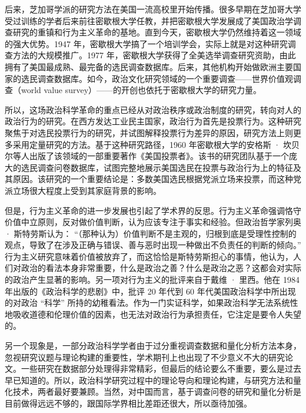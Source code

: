 后来，芝加哥学派的研究方法在美国一流高校里开始传播。很多早期在芝加哥大学受过训练的学者后来前往密歇根大学任教，并把密歇根大学发展成了美国政治学调查研究的重镇和行为主义革命的基地。直到今天，密歇根大学仍然维持着这一领域的强大优势。1947 年，密歇根大学搞了一个培训学会，实际上就是对这种研究调查方法的大规模推广。1977 年，密歇根大学获得了全美选举调查研究资助，由此拥有了美国最成熟、最完备的选民调查数据库。后来，其他机构开始做欧洲主要国家的选民调查数据库。如今，政治文化研究领域的一个重要调查——世界价值观调查（world value survey）——的开创也依托于密歇根大学的研究力量。

所以，这场政治科学革命的重点已经从对政治秩序或政治制度的研究，转向对人的政治行为的研究。在西方发达工业民主国家，政治行为首先是投票行为。这种研究聚焦于对选民投票行为的研究，并试图解释投票行为差异的原因，研究方法上则更多采用定量研究的方法。基于这种研究路径，1960 年密歇根大学的安格斯 · 坎贝尔等人出版了该领域的一部重要著作《美国投票者》。该书的研究团队基于一个庞大的选民调查问卷数据库，试图完整地展示美国选民在投票与政治行为上的特征及其原因。该研究的一个重要结论是：多数美国选民根据党派立场来投票，而这种党派立场很大程度上受到其家庭背景的影响。

但是，行为主义革命的进一步发展也引起了学术界的反思。行为主义革命强调恪守价值中立原则，反对做价值判断，认为应该专注于事实和经验。但政治哲学家列奥 · 斯特劳斯认为： “（那种认为）价值判断不是主观的，归根到底是受理性控制的观点，导致了在涉及正确与错误、善与恶时出现一种做出不负责任的判断的倾向。” 行为主义研究意味着价值被放弃了，而这恰恰是斯特劳斯担心的事情，他认为，人们对政治的看法本身非常重要，什么是政治之善？什么是政治之恶？这都会对实际的政治产生显著的影响。另一项对行为主义的批评来自于戴维 · 里西。他在 1984 年出版的《政治科学的悲剧》中，批评 20 年代到 60 年代美国政治科学中所出现的对政治 “科学” 所持的幼稚看法。作为一门实证科学，如果政治科学无法系统性地吸收道德和伦理价值的因素，也无法对政治行为承担责任，它注定是要令人失望的。

另一个现象是，一部分政治科学学者由于过分重视调查数据和量化分析方法本身，忽视研究议题与理论构建的重要性，学术期刊上也出现了不少意义不大的研究论文。一些研究在数据部分处理得非常精彩，但最后的结论要么不重要，要么是过去早已知道的。所以，政治科学研究过程中的理论导向和理论构建，与研究方法和量化技术，两者最好要兼顾。当然，对中国而言，基于调查问卷的研究和量化分析是目前做得远远不够的，跟国际学界相比差距还很大，所以亟待加强。

